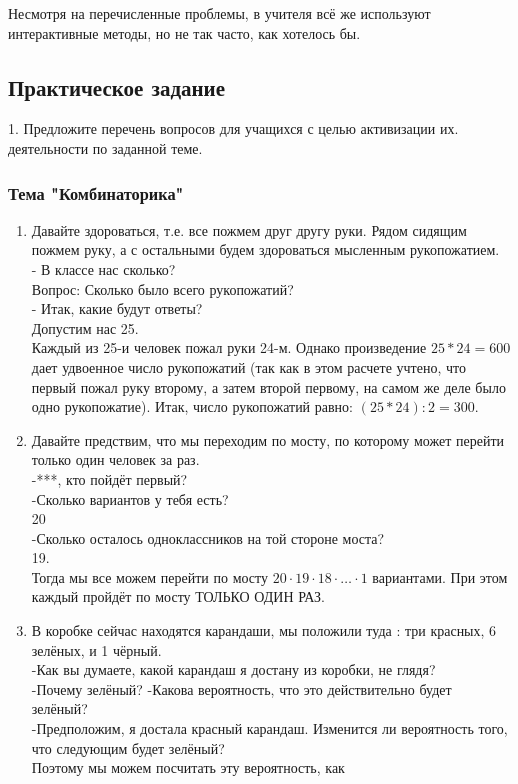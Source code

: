 Несмотря на перечисленные проблемы, в учителя всё же используют интерактивные методы, но не так часто, как хотелось бы.
\newpage

\subsection*{Практическое задание}
1. Предложите перечень вопросов для учащихся с целью активизации их.
деятельности по заданной теме.
\subsubsection*{Тема "Комбинаторика"}

\begin{enumerate}
    \item Давайте здороваться, т.е. все пожмем друг другу руки. Рядом сидящим пожмем руку, а с остальными
    будем здороваться мысленным рукопожатием.\\
    - В классе нас сколько?\\
    Вопрос: Сколько было всего рукопожатий?\\
    - Итак, какие будут ответы?\\
    Допустим нас 25.\\
    Каждый из 25-и человек пожал руки 24-м. Однако произведение $25 * 24 = 600$ дает удвоенное число
    рукопожатий (так как в этом расчете учтено, что первый пожал руку второму, а затем второй первому, на самом же деле было одно рукопожатие). Итак, число рукопожатий равно: $(25 * 24): 2 = 300$.\\
    \item Давайте предствим, что мы переходим по мосту, по которому может перейти только один человек за раз.\\
    -***, кто пойдёт первый? \\
    -Сколько вариантов у тебя есть?\\
    20\\
    -Сколько осталось одноклассников на той стороне моста?\\
    19.\\
    Тогда мы все можем перейти по мосту $20\cdot19\cdot18\cdot \ldots \cdot1$ вариантами. При этом каждый пройдёт по мосту ТОЛЬКО ОДИН РАЗ.\\
    \item В коробке сейчас находятся карандаши, мы положили туда : три красных, 6 зелёных, и 1 чёрный.\\
    -Как вы думаете, какой карандаш я достану из коробки, не глядя?\\
    -Почему зелёный?
    -Какова вероятность, что это действительно будет зелёный?\\
    -Предположим, я достала красный карандаш. Изменится ли вероятность того, что следующим будет зелёный?\\
    Поэтому мы можем посчитать эту вероятность, как



\end{enumerate}

